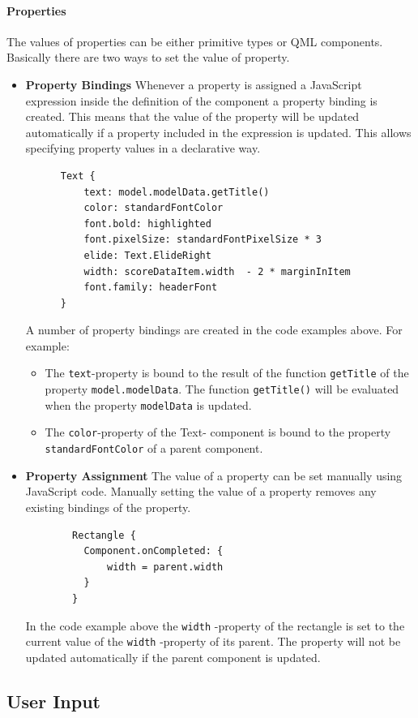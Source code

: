 \paragraph{Properties}
The values of properties can be either primitive types or QML components. Basically there are two ways to set the value of property.
\begin{itemize}
\item{
	\textbf{Property Bindings}
	Whenever a property is assigned a JavaScript expression inside the definition of the component a property binding is created. This means that the value of the property will be updated automatically if a property included in the expression is updated. This allows specifying property values in a declarative way.
	\begin{lstlisting}
	  Text {
	      text: model.modelData.getTitle()
	      color: standardFontColor
	      font.bold: highlighted
	      font.pixelSize: standardFontPixelSize * 3
	      elide: Text.ElideRight
	      width: scoreDataItem.width  - 2 * marginInItem
	      font.family: headerFont
	  }
	\end{lstlisting}
	A number of property bindings are created in the code examples above. For example:
	\begin{itemize}
		\item {The {\tt text}-property is bound to the result of the function {\tt getTitle} of the property {\tt model.modelData}. The function {\tt getTitle()} will be evaluated when the property {\tt modelData} is updated.}
		\item{The {\tt color}-property of the {Text-} component is bound to the property {\tt standardFontColor} of a parent component.}
	\end{itemize}
}
\item {
	\textbf{Property Assignment}
	The value of a property can be set manually using JavaScript code. Manually setting the value of a property removes any existing bindings of the property.
	\begin{lstlisting}
		Rectangle {
		  Component.onCompleted: {
		      width = parent.width
		  }
		}
	\end{lstlisting}
	In the code example above the {\tt width} -property of the rectangle is set to the current value of the {\tt width} -property of its parent. The property will not be updated automatically if the parent component is updated.
}
\end{itemize}
\subsection{User Input}
